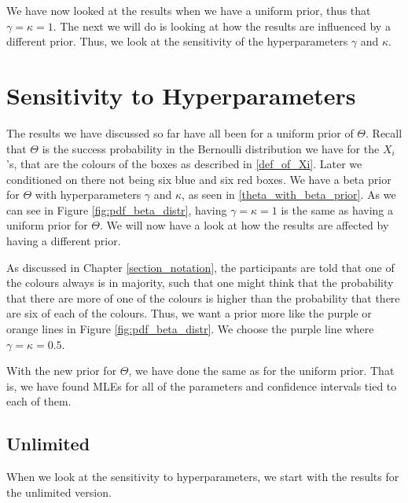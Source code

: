We have now looked at the results when we have a uniform prior, thus that $\gamma=\kappa =1$. The next we will do is looking at how the results are influenced by a different prior. Thus, we look at the sensitivity of the hyperparameters $\gamma$ and $\kappa$.




\section{Sensitivity to Hyperparameters}
The results we have discussed so far have all been for a uniform prior of $\Theta$. 
Recall that $\Theta$ is the success probability in the Bernoulli distribution we have for the $X_i$'s, that are the colours of the boxes as described in \eqref{def_of_Xi}. Later we conditioned on there not being six blue and six red boxes. We have a beta prior for $\Theta$ with hyperparameters $\gamma$ and $\kappa$, as seen in \eqref{theta_with_beta_prior}. As we can see in Figure \ref{fig:pdf_beta_distr}, having $\gamma=\kappa=1$ is the same as having a uniform prior for $\Theta$. We will now have a look at how the results are affected by having a different prior. 

As discussed in Chapter \ref{section_notation}, the participants are told that one of the colours always is in majority, such that one might think that the probability that there are more of one of the colours is higher than the probability that there are six of each of the colours. Thus, we want a prior more like the purple or orange lines in Figure \ref{fig:pdf_beta_distr}. We choose the purple line where $\gamma=\kappa=0.5$.

With the new prior for $\Theta$, we have done the same as for the uniform prior. That is, we have found MLEs for all of the parameters and confidence intervals tied to each of them.

\subsection{Unlimited}
When we look at the sensitivity to hyperparameters, we start with the results for the unlimited version.

